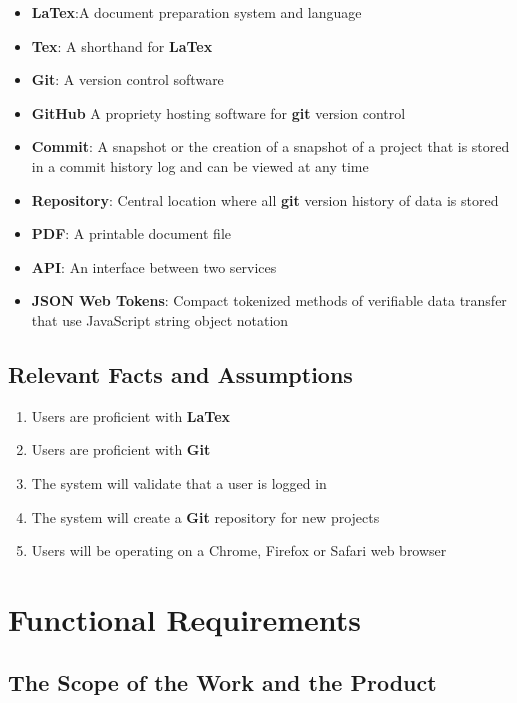 \documentclass[12pt, titlepage]{article}
\begin{document}
	\begin{itemize}
		\item \textbf{LaTex}:A document preparation system and language
		\item \textbf{Tex}: A shorthand for \textbf{LaTex}
		\item \textbf{Git}: A version control software
		\item \textbf{GitHub} A propriety hosting software for \textbf{git} version control
		\item \textbf{Commit}: A snapshot or the creation of a snapshot of a project that is stored in a commit history log and can be viewed at any time
		\item \textbf{Repository}: Central location where all \textbf{git} version history of data is stored
		\item \textbf{PDF}: A printable document file
		\item \textbf{API}: An interface between two services
		\item \textbf{JSON Web Tokens}: Compact tokenized methods of verifiable data transfer that use JavaScript string object notation
	\end{itemize}
	
	\subsection{Relevant Facts and Assumptions}
	
	\begin{enumerate}
		\item Users are proficient with \textbf{LaTex}
		\item Users are proficient with \textbf{Git}
		\item The system will validate that a user is logged in
		\item The system will create a \textbf{Git} repository for new projects
		\item Users will be operating on a Chrome, Firefox or Safari web browser
	\end{enumerate}
	
	\section{Functional Requirements}
	
	\subsection{The Scope of the Work and the Product}
	
\end{document}
